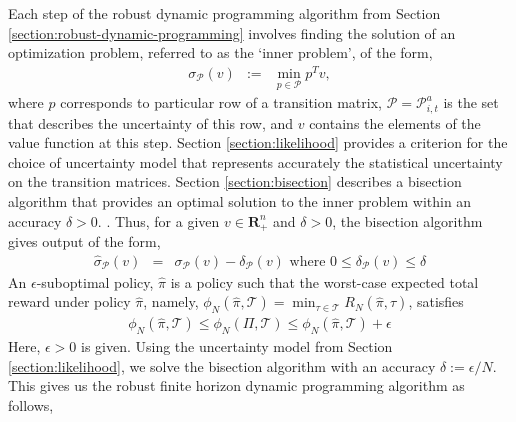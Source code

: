 Each step of the robust dynamic programming algorithm from Section \ref{section:robust-dynamic-programming} involves finding the solution of an optimization problem, referred to as the `inner problem', of the form,
\begin{eqnarray*}
\sigma_{\mathcal{P}}(v) &:=& \min_{p \in \mathcal{P}} p^Tv,
\end{eqnarray*}
where $p$ corresponds to particular row of a transition matrix, $\mathcal{P} = \mathcal{P}^{a}_{i,t}$ is the set that describes the uncertainty of this row, and $v$ contains the elements of the value function at this step. Section \ref{section:likelihood} provides a criterion for the choice of uncertainty model that represents accurately the statistical uncertainty on the transition matrices. Section \ref{section:bisection} describes a bisection algorithm that provides an optimal solution to the inner problem within an accuracy $\delta > 0$. . Thus, for a given $v \in \textbf{R}^n_+$ and $\delta > 0$, the bisection algorithm gives output of the form,
\begin{eqnarray*}
\hat{\sigma}_{\mathcal{P}}(v) &=& \sigma_{\mathcal{P}}(v) - \delta_{\mathcal{P}}(v) \textrm{ where } 0 \leq \delta_{\mathcal{P}}(v) \leq \delta
\end{eqnarray*}
An $\epsilon$-suboptimal policy, $\hat{\pi}$ is a policy such that the worst-case expected total reward under policy $\hat{\pi}$, namely, $\phi_N(\hat{\pi},\mathcal{T}) = \min_{\tau \in \mathcal{T}}R_N(\hat{\pi}, \tau)$, satisfies 
\begin{eqnarray*}
\phi_N(\hat{\pi},\mathcal{T}) \leq \phi_N(\Pi,\mathcal{T}) \leq \phi_N(\hat{\pi},\mathcal{T}) + \epsilon
\end{eqnarray*}
Here, $\epsilon > 0$ is given. Using the uncertainty model from Section \ref{section:likelihood}, we solve the bisection algorithm with an accuracy $\delta := \epsilon /N$. This gives us the robust finite horizon dynamic programming algorithm as follows,

